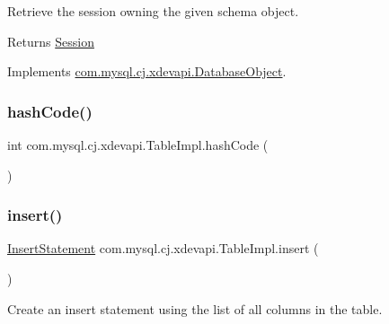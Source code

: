 Retrieve the session owning the given schema object.

\begin{DoxyReturn}{Returns}
\mbox{\hyperlink{interfacecom_1_1mysql_1_1cj_1_1xdevapi_1_1_session}{Session}} 
\end{DoxyReturn}


Implements \mbox{\hyperlink{interfacecom_1_1mysql_1_1cj_1_1xdevapi_1_1_database_object_a0bebc7132108a9cfcffed4a599b2dad5}{com.\+mysql.\+cj.\+xdevapi.\+Database\+Object}}.

\mbox{\label{classcom_1_1mysql_1_1cj_1_1xdevapi_1_1_table_impl_aeba962a3af205b868ef18847f8f166a8}} 
\subsubsection{\texorpdfstring{hash\+Code()}{hashCode()}}
{\footnotesize\ttfamily int com.\+mysql.\+cj.\+xdevapi.\+Table\+Impl.\+hash\+Code (\begin{DoxyParamCaption}{ }\end{DoxyParamCaption})}

\mbox{\label{classcom_1_1mysql_1_1cj_1_1xdevapi_1_1_table_impl_a1da24c004f76d313383111cb4f250a3c}} 
\subsubsection{\texorpdfstring{insert()}{insert()}\hspace{0.1cm}{\footnotesize\ttfamily [1/3]}}
{\footnotesize\ttfamily \mbox{\hyperlink{interfacecom_1_1mysql_1_1cj_1_1xdevapi_1_1_insert_statement}{Insert\+Statement}} com.\+mysql.\+cj.\+xdevapi.\+Table\+Impl.\+insert (\begin{DoxyParamCaption}{ }\end{DoxyParamCaption})}

Create an insert statement using the list of all columns in the table.

